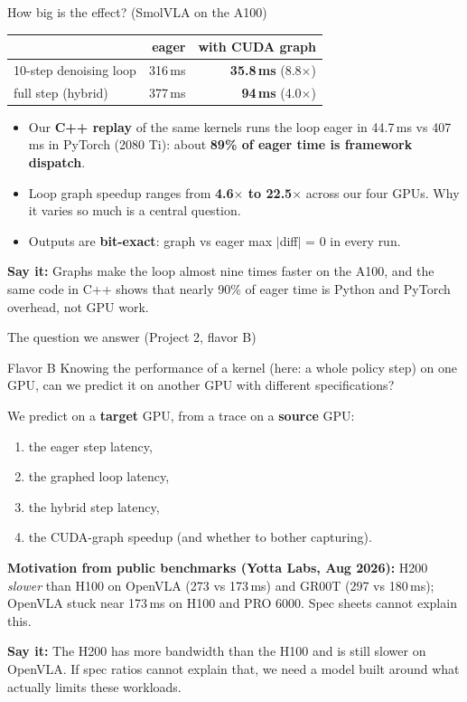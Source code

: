 \documentclass[aspectratio=169,10pt]{beamer}
\newcommand{\say}[1]{\par\vfill\noindent\colorbox{soft}{\parbox{\dimexpr\textwidth-2\fboxsep\relax}{\small\textbf{\textcolor{accent}{Say it:}} #1}}}
\begin{document}
\begin{frame}{How big is the effect? (SmolVLA on the A100)}
\centering
\begin{tabular}{lrr}\toprule
 & eager & with CUDA graph\\\midrule
10-step denoising loop & 316\,ms & \textbf{35.8\,ms} (8.8$\times$)\\
full step (hybrid) & 377\,ms & \textbf{94\,ms} (4.0$\times$)\\\bottomrule
\end{tabular}
\vspace{1em}
\begin{itemize}
\item Our \textbf{C++ replay} of the same kernels runs the loop eager in 44.7\,ms vs 407\,ms in
  PyTorch (2080 Ti): about \textbf{89\% of eager time is framework dispatch}.
\item Loop graph speedup ranges from \textbf{4.6$\times$ to 22.5$\times$} across our four GPUs.
  Why it varies so much is a central question.
\item Outputs are \textbf{bit-exact}: graph vs eager max $|$diff$|$ = 0 in every run.
\end{itemize}
\say{Graphs make the loop almost nine times faster on the A100, and the same code in C++ shows
that nearly 90\% of eager time is Python and PyTorch overhead, not GPU work.}
\end{frame}

\begin{frame}{The question we answer (Project 2, flavor B)}
\begin{block}{Flavor B}
Knowing the performance of a kernel (here: a whole policy step) on one GPU, can we predict
it on another GPU with different specifications?
\end{block}
We predict on a \textbf{target} GPU, from a trace on a \textbf{source} GPU:
\begin{enumerate}
\item the eager step latency,
\item the graphed loop latency,
\item the hybrid step latency,
\item the CUDA-graph speedup (and whether to bother capturing).
\end{enumerate}
\textbf{Motivation from public benchmarks (Yotta Labs, Aug 2026):} H200 \emph{slower} than H100
on OpenVLA (273 vs 173\,ms) and GR00T (297 vs 180\,ms); OpenVLA stuck near 173\,ms on H100 and
PRO 6000. Spec sheets cannot explain this.
\say{The H200 has more bandwidth than the H100 and is still slower on OpenVLA. If spec ratios
cannot explain that, we need a model built around what actually limits these workloads.}
\end{frame}
\end{document}
